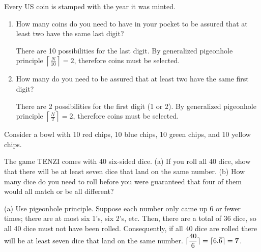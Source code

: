 \begin{questions}
 Every US coin is stamped with the year it was minted. 
\begin{enumerate}[label=(\alph*), itemsep=0pt, topsep=0pt]
  \item How many coins do you need to have in your pocket to be assured that at least two have the same last digit?
    \begin{solution}
      There are 10 possibilities for the last digit.  By generalized pigeonhole principle $ \left\lceil \frac{N}{10} \right\rceil = 2$, therefore  coins must be selected.
    \end{solution}  
  \item How many do you need to be assured that at least two have the same first digit?
    \begin{solution}
      There are 2 possibilities for the first digit (1 or 2).  By generalized pigeonhole principle $ \left\lceil \frac{N}{2} \right\rceil = 2$, therefore  coins must be selected.
    \end{solution}
\end{enumerate}



 Consider a bowl with 10 red chips, 10 blue chips, 10 green chips, and 10 yellow chips.  



 The game TENZI comes with 40 six-sided dice.  (a) If you roll all 40 dice, show that there will be at least seven dice that land on the same number. (b) How many dice do you need to roll before you were guaranteed that four of them would all match or be all different? 
  \ifprintanswers
    \vspace{-10pt}
  \fi
  \begin{solution}
    (a) Use pigeonhole principle.  Suppose each number only came up 6 or fewer times; there are at most six 1's, six 2's, etc. Then, there are a total of 36 dice, so all 40 dice must not have been rolled.  Consequently, if all 40 dice are rolled there will be at least seven dice that land on the same number.  $\displaystyle \lceil \frac{40}{6} \rceil = \lceil 6.\bar{6} \rceil = \mathbf{7}$.


\end{solution}
\end{questions}
